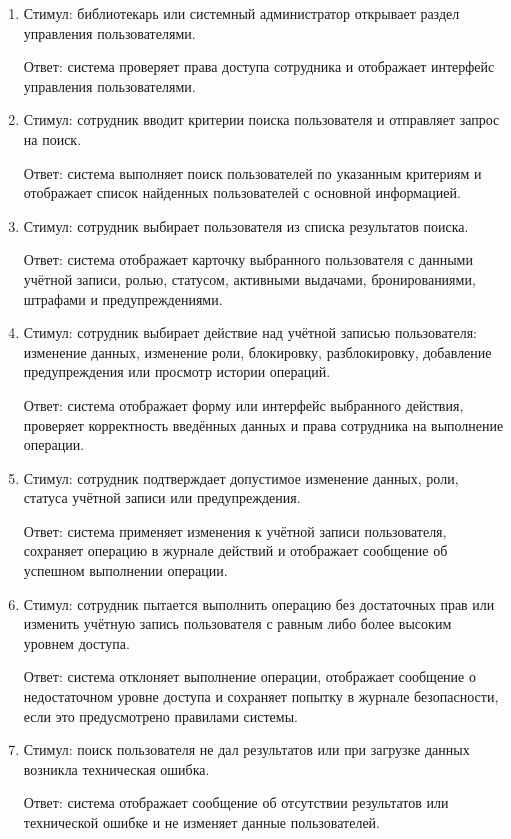 \documentclass[12pt,a4paper]{article}
\begin{document}
	\begin{enumerate}
		\item Стимул: библиотекарь или системный администратор открывает раздел
		управления пользователями.
		
		Ответ: система проверяет права доступа сотрудника и отображает интерфейс
		управления пользователями.
		
		\item Стимул: сотрудник вводит критерии поиска пользователя и отправляет
		запрос на поиск.
		
		Ответ: система выполняет поиск пользователей по указанным критериям
		и отображает список найденных пользователей с основной информацией.
		
		\item Стимул: сотрудник выбирает пользователя из списка результатов поиска.
		
		Ответ: система отображает карточку выбранного пользователя с данными
		учётной записи, ролью, статусом, активными выдачами, бронированиями,
		штрафами и предупреждениями.
		
		\item Стимул: сотрудник выбирает действие над учётной записью пользователя:
		изменение данных, изменение роли, блокировку, разблокировку, добавление
		предупреждения или просмотр истории операций.
		
		Ответ: система отображает форму или интерфейс выбранного действия,
		проверяет корректность введённых данных и права сотрудника на выполнение
		операции.
		
		\item Стимул: сотрудник подтверждает допустимое изменение данных, роли,
		статуса учётной записи или предупреждения.
		
		Ответ: система применяет изменения к учётной записи пользователя,
		сохраняет операцию в журнале действий и отображает сообщение об успешном
		выполнении операции.
		
		\item Стимул: сотрудник пытается выполнить операцию без достаточных прав
		или изменить учётную запись пользователя с равным либо более высоким уровнем
		доступа.
		
		Ответ: система отклоняет выполнение операции, отображает сообщение
		о недостаточном уровне доступа и сохраняет попытку в журнале безопасности,
		если это предусмотрено правилами системы.
		
		\item Стимул: поиск пользователя не дал результатов или при загрузке данных
		возникла техническая ошибка.
		
		Ответ: система отображает сообщение об отсутствии результатов или
		технической ошибке и не изменяет данные пользователей.
	\end{enumerate}
	
\end{document}
